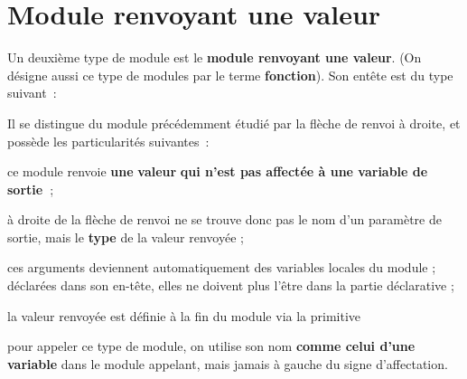 \section{Module renvoyant une valeur}

	Un deuxième type de module est le 
	\textbf{module renvoyant une valeur}. 
	(On désigne aussi ce type de modules par le terme \textbf{fonction}).
	Son entête est du type suivant~:


	Il se distingue du module précédemment étudié par la flèche de renvoi à
	droite, et possède les particularités suivantes~:

	\begin{liste}
	\item {
		{ce module renvoie
		}{\textbf{une}}{
		}{\textbf{valeur}}{
		}{\textbf{qui n’est pas affectée à une variable
		de
		}}{\textbf{sortie~}}{;}}
	\item {
		{à droite de la flèche de renvoi ne se trouve
		donc pas le nom d’un paramètre de sortie, mais le
		}{\textbf{type}}{ de la
		valeur renvoyée ;}}
	\item {
		}
	\item {
		}
	\item {
		ces arguments deviennent automatiquement des variables locales du module
		; déclarées dans son en-tête, elles ne doivent plus l’être dans la
		partie déclarative ;}
	\item {
		{la valeur renvoyée est définie à la fin du
		module via la primitive
		}}
	\item {
		pour appeler ce type de module, on utilise son nom \textbf{comme celui
		d’une variable} dans le module appelant, mais jamais à gauche du signe
		d’affectation.}
	\end{liste}

